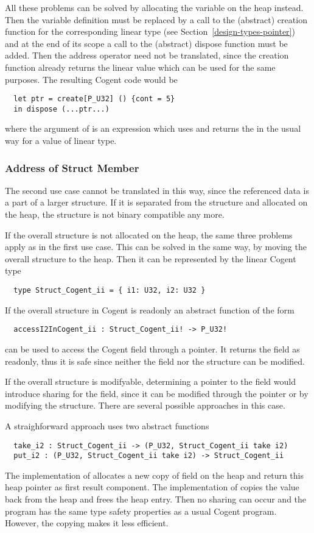 All these problems can be solved by allocating the variable on the heap instead. Then the variable definition
must be replaced by a call to the (abstract) creation function for the corresponding linear type 
(see Section~\ref{design-types-pointer}) and 
at the end of its scope a call to the (abstract) dispose function must be added. Then the address
operator need not be translated, since the creation function already returns the linear value which can be 
used for the same purposes. The resulting Cogent code would be
\begin{verbatim}
  let ptr = create[P_U32] () {cont = 5}
  in dispose (...ptr...)
\end{verbatim}
where the argument of  is an expression which uses and returns the  in the 
usual way for a value of linear type.

\subsubsection{Address of Struct Member}

The second use case cannot be translated in this way, since the referenced data is a part of a larger structure.
If it is separated from the structure and allocated on the heap, the structure is not binary compatible any more.

If the overall structure is not allocated on the heap, the same three problems apply as in the first use case.
This can be solved in the same way, by moving the overall structure to the heap. Then it can be represented
by the linear Cogent type
\begin{verbatim}
  type Struct_Cogent_ii = { i1: U32, i2: U32 }
\end{verbatim}

If the overall structure in Cogent is readonly an abstract function of the form
\begin{verbatim}
  accessI2InCogent_ii : Struct_Cogent_ii! -> P_U32!
\end{verbatim}
can be used to access the Cogent field through a pointer. It returns the field as readonly, thus it is safe 
since neither the field nor the structure can be modified.

If the overall structure is modifyable, determining a pointer to the field would introduce sharing for the
field, since it can be modified through the pointer or by modifying the structure. There are several possible
approaches in this case.

A straighforward approach uses two abstract functions
\begin{verbatim}
  take_i2 : Struct_Cogent_ii -> (P_U32, Struct_Cogent_ii take i2)
  put_i2 : (P_U32, Struct_Cogent_ii take i2) -> Struct_Cogent_ii
\end{verbatim}
The implementation of  allocates a new copy of field  on the heap
and return this heap pointer as first result component. The implementation of  copies the 
value back from the heap and frees the heap entry. Then no sharing can occur and the program has the 
same type safety properties as a usual Cogent program. However, the copying makes it less efficient.

